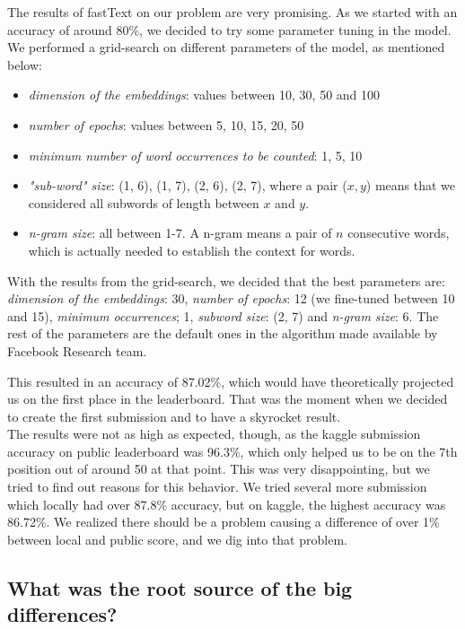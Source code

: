 \documentclass[10pt,conference,compsocconf]{IEEEtran}
\begin{document}
The results of fastText on our problem are very promising. As we started with an accuracy of around 80\%, we decided to try some parameter tuning in the model. We performed a grid-search on different parameters of the model, as mentioned below:

\begin{itemize}
	\item \textit{dimension of the embeddings}: values between 10, 30, 50 and 100
	\item \textit{number of epochs}: values between 5, 10, 15, 20, 50
	\item \textit{minimum number of word occurrences to be counted}: 1, 5, 10
	\item \textit{"sub-word" size}: (1, 6), (1, 7), (2, 6), (2, 7), where a pair ($x, y$) means that we considered all subwords of length between $x$ and $y$.
	
	\item \textit{n-gram size}: all between 1-7. A n-gram means a pair of $n$ consecutive words, which is actually needed to establish the context for words.  
\end{itemize}

With the results from the grid-search, we decided that the best parameters are: \textit{dimension of the embeddings}: 30, \textit{number of epochs}: 12 (we fine-tuned between 10 and 15), \textit{minimum occurrences}; 1, \textit{subword size}: (2, 7) and \textit{n-gram size}: 6. The rest of the parameters are the default ones in the algorithm made available by Facebook Research team. 

This resulted in an accuracy of 87.02\%, which would have theoretically projected us on the first place in the leaderboard. That was the moment when we decided to create the first submission and to have a skyrocket result. \\

The results were not as high as expected, though, as the kaggle submission accuracy on public leaderboard was 96.3\%, which only helped us to be on the 7th position out of around 50 at that point. This was very disappointing, but we tried to find out reasons for this behavior. We tried several more submission which locally had over 87.8\% accuracy, but on kaggle, the highest accuracy was 86.72\%. We realized there should be a problem causing a difference of over 1\% between local and public score, and we dig into that problem.

\subsection{What was the root source of the big differences?}
\end{document}

